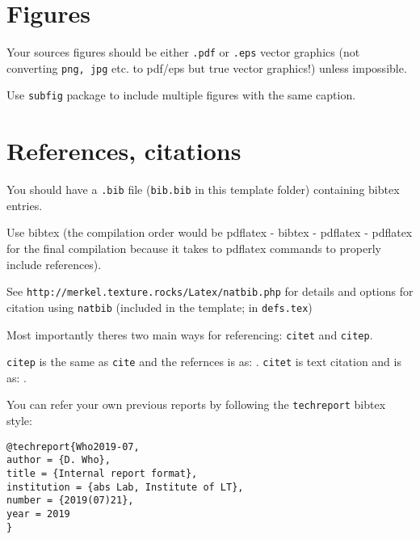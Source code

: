 \section{Figures}

Your sources figures should be either \texttt{.pdf} or \texttt{.eps} vector
graphics (not converting \texttt{png, jpg} etc. to pdf/eps but true vector
graphics!) unless impossible.

Use \texttt{subfig} package to include multiple figures with the same caption.

\section{References, citations}

You should have a \texttt{.bib} file (\texttt{bib.bib} in this template folder)
containing bibtex entries.

Use bibtex (the compilation order would be pdflatex - bibtex - pdflatex -
pdflatex for the final compilation because it takes to pdflatex commands to
properly include references).

See \texttt{http://merkel.texture.rocks/Latex/natbib.php} for details and
options for citation using \texttt{natbib} (included in the template; in
\texttt{defs.tex})

Most importantly theres two main ways for referencing: \texttt{citet} and
\texttt{citep}.

\texttt{citep} is the same as \texttt{cite} and the refernces is as:
\citep{Karamcheti1956}. \texttt{citet} is text citation and is as:
\citet{Karamcheti1956}.

You can refer your own previous reports by following the \texttt{techreport}
bibtex style:

\begin{verbatim}
@techreport{Who2019-07,
author = {D. Who},
title = {Internal report format},
institution = {abs Lab, Institute of LT},
number = {2019(07)21},
year = 2019
}
\end{verbatim}

